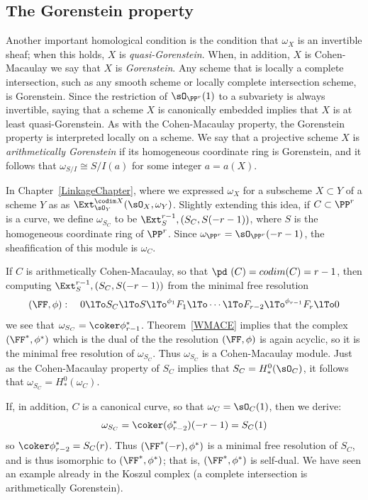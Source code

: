 \subsection{The Gorenstein property} 
Another important homological condition is the condition that $\omega_X$ is an invertible sheaf; when this holds, $X$ is \emph{quasi-Gorenstein}. When, in addition, $X$ is Cohen-Macaulay we say that $X$ is \emph{Gorenstein}. Any scheme that is locally a complete intersection, such as any smooth scheme or locally complete intersection scheme, is Gorenstein. Since the restriction
of $\sO_{\PP^r}(1)$ to a subvariety is always invertible, saying that a scheme $X$ is canonically embedded implies that
$X$ is at least quasi-Gorenstein. As with the Cohen-Macaulay property, the Gorenstein property is interpreted locally
on a scheme. We say that a projective scheme $X$ is \emph{arithmetically Gorenstein}
if its homogeneous coordinate ring is Gorenstein, and it follows that $\omega_{S/I} \cong S/I(a)$ for some integer $a = a(X)$.

In Chapter~\ref{LinkageChapter}, where we expressed $\omega_X$
for a subscheme $X\subset Y$ of a scheme $Y$ as
as $\Ext^{\codim X}_{\sO_Y}(\sO_X, \omega_Y)$. Slightly extending this idea, if $C\subset \PP^r$ is a curve,
 we define $\omega_{S_C}$ to be $\Ext^{r-1}_S,(S_C, S(-r-1))$, where $S$ is the homogeneous coordinate ring of $\PP^r$.
Since $\omega_{\PP^r} = \sO_{\PP^r}(-r-1)$, the sheafification of this module is  $\omega_C$.

If $C$ is arithmetically Cohen-Macaulay, so that
$\pd\ (C) = codim(C) = r-1$,  then 
computing $\Ext^{r-1}_S,(S_C, S(-r-1))$ from the minimal free resolution 
$$
(\FF, \phi):\quad 0\lTo S_C \lTo S\lTo^{\phi_1} F_1 \lTo \cdots \lTo F_{r-2} \lTo^{\phi_{r-1}} F_r\lTo 0
$$
we see that $\omega_{S_C} = \coker \phi_{r-1}^*$. Theorem~\ref{WMACE} implies that the complex $(\FF^*, \phi^*)$ which is the dual
of the the resolution $(\FF, \phi)$ is again acyclic, so it is the minimal free resolution of $\omega_{S_C}$. Thus 
$\omega_{S_C}$ is a Cohen-Macaulay module. Just as the Cohen-Macaulay property of
$S_C$ implies that $S_C = H^0_*(\sO_C)$, it follows that $\omega_{S_C} = H^0_*(\omega_C)$.

If, in addition, $C$ is a canonical curve, so that $\omega_C = \sO_C(1)$, then we derive:
$$
\omega_{S_C} = \coker(\phi_{r-2}^*)(-r-1) = S_C(1)
$$
so $\coker \phi_{r-2}^* = S_C(r)$. Thus $(\FF^*(-r), \phi^*)$ is a minimal free resolution of $S_C$, and is thus isomorphic to
$(\FF^*, \phi^*)$; that is, $(\FF^*, \phi^*)$ is self-dual.
 We have seen an example already
in the Koszul complex (a complete intersection is arithmetically Gorenstein).

